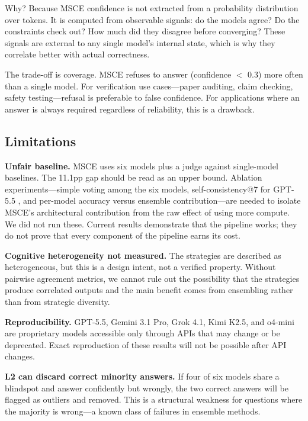 \documentclass[11pt,a4paper]{article}
\begin{document}
Why? Because MSCE confidence is not extracted from a probability distribution over tokens. It is computed from observable signals: do the models agree? Do the constraints check out? How much did they disagree before converging? These signals are external to any single model's internal state, which is why they correlate better with actual correctness.

The trade-off is coverage. MSCE refuses to answer (confidence $<$ 0.3) more often than a single model. For verification use cases---paper auditing, claim checking, safety testing---refusal is preferable to false confidence. For applications where an answer is always required regardless of reliability, this is a drawback.

\subsection{Limitations}
\label{sec:limitations}

\textbf{Unfair baseline.} MSCE uses six models plus a judge against single-model baselines. The 11.1pp gap should be read as an upper bound. Ablation experiments---simple voting among the six models, self-consistency@7 for GPT-5.5 \cite{wang2022selfconsistency}, and per-model accuracy versus ensemble contribution---are needed to isolate MSCE's architectural contribution from the raw effect of using more compute. We did not run these. Current results demonstrate that the pipeline works; they do not prove that every component of the pipeline earns its cost.

\textbf{Cognitive heterogeneity not measured.} The strategies are described as heterogeneous, but this is a design intent, not a verified property. Without pairwise agreement metrics, we cannot rule out the possibility that the strategies produce correlated outputs and the main benefit comes from ensembling rather than from strategic diversity.

\textbf{Reproducibility.} GPT-5.5, Gemini 3.1 Pro, Grok 4.1, Kimi K2.5, and o4-mini are proprietary models accessible only through APIs that may change or be deprecated. Exact reproduction of these results will not be possible after API changes.

\textbf{L2 can discard correct minority answers.} If four of six models share a blindspot and answer confidently but wrongly, the two correct answers will be flagged as outliers and removed. This is a structural weakness for questions where the majority is wrong---a known class of failures in ensemble methods.
\end{document}
